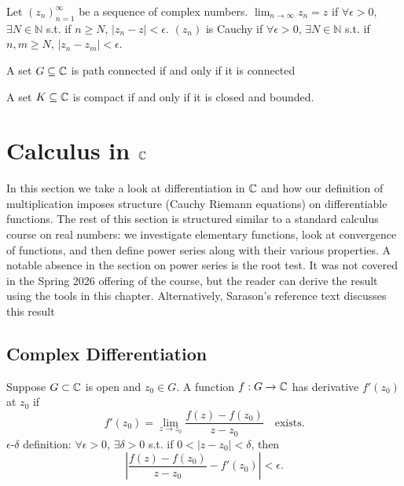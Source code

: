 \documentclass[11pt]{article}
\begin{document}
\begin{definition}
Let $(z_n)_{n=1}^\infty$ be a sequence of complex numbers.
$\lim_{n \to \infty} z_n = z$ if $\forall \epsilon > 0$, $\exists N \in \mathbb{N}$ s.t. if $n \ge N$, $|z_n - z| < \epsilon$.
$(z_n)$ is Cauchy if $\forall \epsilon > 0$, $\exists N \in \mathbb{N}$ s.t. if $n, m \ge N$, $|z_n - z_m| < \epsilon$.
\end{definition}


\begin{proposition}
    A set $G \subseteq {\mathbb{C}}$ is path connected if and only if it is connected
\end{proposition}

\begin{theorem}
    A set $K \subseteq {\mathbb{C}}$ is compact if and only if it is closed and bounded.
\end{theorem}

\newpage
\section{Calculus in ${\mathbb{C}}$}

In this section we take a look at differentiation in ${\mathbb{C}}$ and how our definition of multiplication imposes structure (Cauchy Riemann equations) on differentiable functions. The rest of this section is structured similar to a standard calculus course on real numbers: we investigate elementary functions, look at convergence of functions, and then define power series along with their various properties. A notable absence in the section on power series is the root test. It was not covered in the Spring 2026 offering of the course, but the reader can derive the result using the tools in this chapter. Alternatively, Sarason's reference text discusses this result

\subsection{Complex Differentiation}
\begin{definition}
Suppose $G \subset {\mathbb{C}}$ is open and $z_0 \in G$. A function $f: G \to {\mathbb{C}}$ has derivative $f'(z_0)$ at $z_0$ if
\[
f'(z_0) = \lim_{z \to z_0} \frac{f(z) - f(z_0)}{z - z_0} \quad \text{exists.}
\]
$\epsilon$-$\delta$ definition: $\forall \epsilon > 0$, $\exists \delta > 0$ s.t. if $0 < |z - z_0| < \delta$, then
\[
\left| \frac{f(z) - f(z_0)}{z - z_0} - f'(z_0) \right| < \epsilon.
\]
\end{definition}
\end{document}
